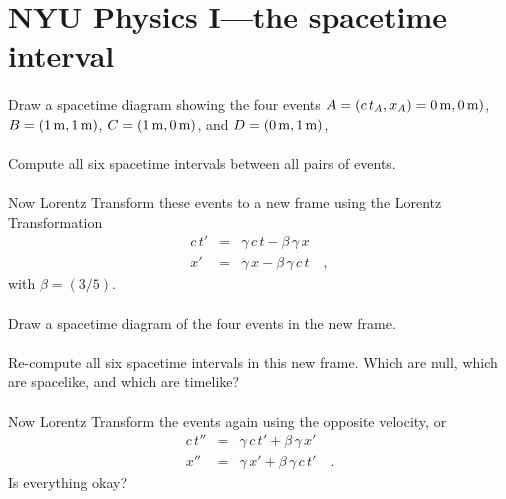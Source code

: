 \documentclass[12pt]{article}
\begin{document}
\section*{NYU Physics I---the spacetime interval}

\paragraph{\theproblem}%
Draw a spacetime diagram showing the four events
$A=(c\,t_A,x_A)=0\,\mathrm{m},0\,\mathrm{m})$, $B=(1\,\mathrm{m},1\,\mathrm{m})$, $C=(1\,\mathrm{m},0\,\mathrm{m})$,
and $D=(0\,\mathrm{m},1\,\mathrm{m})$,

\paragraph{\theproblem}%
Compute all six spacetime intervals between all pairs of events.

\paragraph{\theproblem}%
Now Lorentz Transform these events to a new frame using the Lorentz
Transformation
\begin{eqnarray}\displaystyle
c\,t' & = & \gamma\,c\,t - \beta\,\gamma\,   x \nonumber\\
   x' & = & \gamma\,   x - \beta\,\gamma\,c\,t \quad ,
\end{eqnarray}
with $\beta=(3/5)$.

\paragraph{\theproblem}%
Draw a spacetime diagram of the four events in the new frame.

\paragraph{\theproblem}%
Re-compute all six spacetime intervals in this new frame.  Which are
null, which are spacelike, and which are timelike?

\paragraph{\theproblem}%
Now Lorentz Transform the events again using the opposite velocity, or
\begin{eqnarray}\displaystyle
c\,t'' & = & \gamma\,c\,t' + \beta\,\gamma\,   x' \nonumber\\
   x'' & = & \gamma\,   x' + \beta\,\gamma\,c\,t' \quad .
\end{eqnarray}
Is everything okay?
\end{document}
